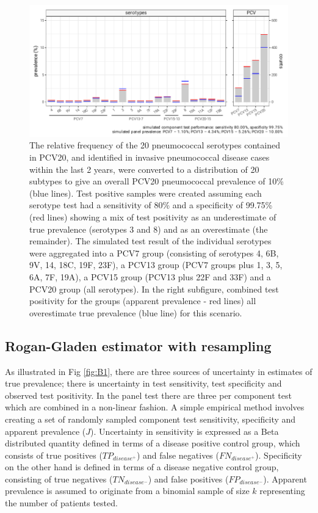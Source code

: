 \documentclass[a4paper, 12pt, twoside]{article}
\let\Oldsubsection\subsection
\renewcommand{\subsection}{\FloatBarrier\Oldsubsection}
\begin{document}
\begin{figure}[h!]
\centering
  \includegraphics{fig/simulation_setup_prev_10_v2}
  \caption{The relative frequency of the 20 pneumococcal serotypes contained in PCV20, and identified in invasive pneumococcal disease cases within the last 2 years, were converted to a distribution of 20 subtypes to give an overall PCV20 pneumococcal prevalence of 10\% (blue lines). Test positive samples were created assuming each serotype test had a sensitivity of 80\% and a specificity of 99.75\% (red lines) showing a mix of test positivity as an underestimate of true prevalence (serotypes 3 and 8) and as an overestimate (the remainder). The simulated test result of the individual serotypes were aggregated into a PCV7 group (consisting of serotypes 4, 6B, 9V, 14, 18C, 19F, 23F), a PCV13 group (PCV7 groups plus 1, 3, 5, 6A, 7F, 19A), a PCV15 group (PCV13 plus 22F and 33F) and a PCV20 group (all serotypes). In the right subfigure, combined test positivity for the groups (apparent prevalence - red lines) all overestimate true prevalence (blue line) for this scenario.}
\label{fig:B2}
\end{figure}

\subsection{Rogan-Gladen estimator with resampling}

As illustrated in Fig \ref{fig:B1}, there are three sources of uncertainty in estimates of true prevalence; there is uncertainty in test sensitivity, test specificity and observed test positivity. In the panel test there are three per component test which are combined in a non-linear fashion. A simple empirical method involves creating a set of randomly sampled component test sensitivity, specificity and apparent prevalence (\(J\)). Uncertainty in sensitivity is expressed as a Beta distributed quantity defined in terms of a disease positive control group, which consists of true positives (\(TP_{disease^+}\)) and false negatives (\(FN_{disease^+}\)). Specificity on the other hand is defined in terms of a disease negative control group, consisting of true negatives (\(TN_{disease^-}\)) and false positives (\(FP_{disease^-}\)). Apparent prevalence is assumed to originate from a binomial sample of size \(k\) representing the number of patients tested.
\end{document}
